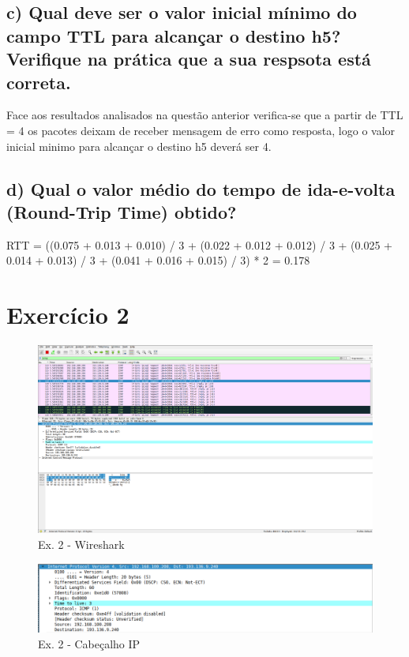 \documentclass[a4paper]{report}
\begin{document}
\subsection{c) Qual deve ser o valor inicial mínimo do campo TTL para alcançar o destino h5?
Verifique na prática que a sua respsota está correta.}

Face aos resultados analisados na questão anterior verifica-se que a partir de TTL = 4
os pacotes deixam de receber mensagem de erro como resposta, logo o valor inicial
minimo para alcançar o destino h5 deverá ser 4.

\subsection{d) Qual o valor médio do tempo de ida-e-volta (Round-Trip Time) obtido?}

RTT = ((0.075 + 0.013 + 0.010) / 3 + (0.022 + 0.012 + 0.012) / 3 + (0.025 + 0.014 + 0.013) / 3 + (0.041 + 0.016 + 0.015) / 3) * 2 = 0.178

\pagebreak

\section{Exercício 2}

\begin{figure}[H]
    \centering 
    \includegraphics[width=\textwidth]{images/wiresharkEx2.png}  
    \caption{Ex. 2 - Wireshark}
    \label{fig:wiresharkEx2}
\end{figure}

\begin{figure}[H]
    \centering 
    \includegraphics[width=\textwidth]{images/ipEx2.png}
    \caption{Ex. 2 - Cabeçalho IP}
    \label{fig:ipEx2}
\end{figure}
\end{document}

